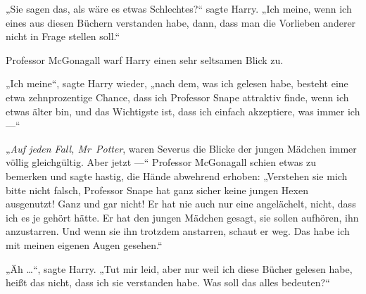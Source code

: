 „Sie sagen das, als wäre es etwas Schlechtes?“ sagte Harry.
„Ich meine, wenn ich eines aus diesen Büchern verstanden habe, dann, dass man die Vorlieben anderer nicht in Frage stellen soll.“

Professor McGonagall warf Harry einen sehr seltsamen Blick zu.

„Ich meine“, sagte Harry wieder, „nach dem, was ich gelesen habe, besteht eine etwa zehnprozentige Chance, dass ich Professor Snape attraktiv finde, wenn ich etwas älter bin, und das Wichtigste ist, dass ich einfach akzeptiere, was immer ich —“

„\emph{Auf jeden Fall, Mr~Potter}, waren Severus die Blicke der jungen Mädchen immer völlig gleichgültig. Aber jetzt —“ Professor McGonagall schien etwas zu bemerken und sagte hastig, die Hände abwehrend erhoben:
„Verstehen sie mich bitte nicht falsch, Professor Snape hat ganz sicher keine jungen Hexen ausgenutzt! Ganz und gar nicht! Er hat nie auch nur eine angelächelt, nicht, dass ich es je gehört hätte. Er hat den jungen Mädchen gesagt, sie sollen aufhören, ihn anzustarren. Und wenn sie ihn trotzdem anstarren, schaut er weg. Das habe ich mit meinen eigenen Augen gesehen.“

„Äh …“, sagte Harry.
„Tut mir leid, aber nur weil ich diese Bücher gelesen habe, heißt das nicht, dass ich sie verstanden habe. Was soll das alles bedeuten?“

